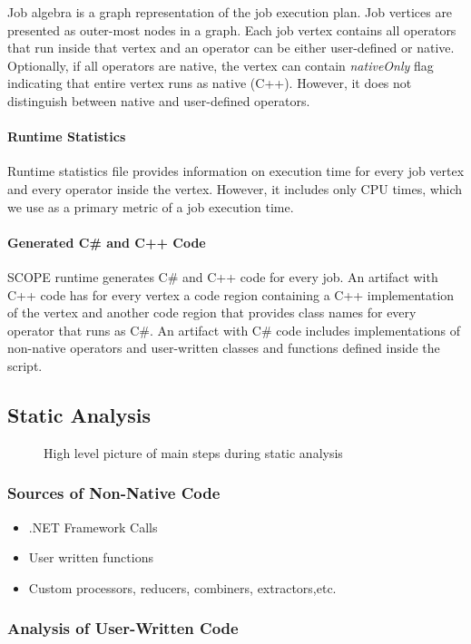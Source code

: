Job algebra is a graph representation of the job execution plan. Job vertices are presented as outer-most nodes in a graph. Each job vertex contains all operators that run inside that vertex and an operator can be either user-defined or native. Optionally, if all operators are native, the vertex can contain \emph{nativeOnly} flag indicating that entire vertex runs as native (C++). However, it does not distinguish between native and user-defined operators.


\paragraph{Runtime Statistics}
Runtime statistics file provides information on execution time for every job vertex and every operator inside the vertex. However, it includes only CPU times, which we use as a primary metric of a job execution time. 



\paragraph{Generated C\# and C++ Code}
SCOPE runtime generates C\# and C++ code for every job. An artifact with C++ code has for every vertex a code region containing a C++ implementation of the vertex and another code region that provides class names for every operator that runs as C\#. An artifact with C\# code includes implementations of non-native operators and user-written classes and functions defined inside the script.

\subsection{Static Analysis}

\begin{figure}[ht]


\caption{High level picture of main steps during static analysis}
\label{fig:analysis}
\end{figure}


\subsubsection{Sources of Non-Native Code}

\begin{itemize}
\item .NET Framework Calls
\item User written functions
\item Custom processors, reducers, combiners, extractors,etc.
\end{itemize}

\subsubsection{Analysis of User-Written Code}